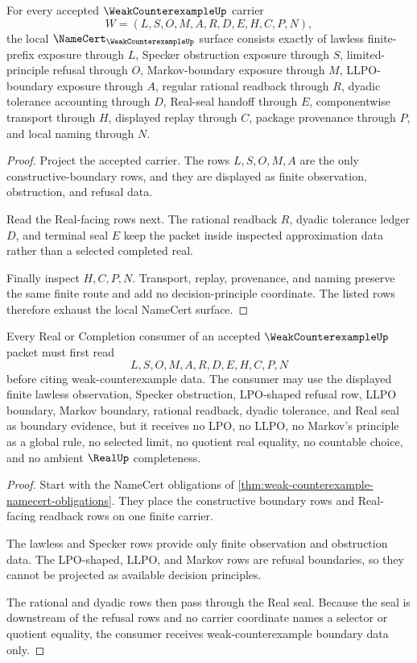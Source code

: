 \begin{theorem}
\label{thm:weak-counterexample-namecert-obligations}
For every accepted $\WeakCounterexampleUp$ carrier
$$
W=(L,S,O,M,A,R,D,E,H,C,P,N),
$$
the local $\NameCert_{\WeakCounterexampleUp}$ surface consists exactly of lawless finite-prefix exposure through $L$, Specker obstruction exposure through $S$, limited-principle refusal through $O$, Markov-boundary exposure through $M$, LLPO-boundary exposure through $A$, regular rational readback through $R$, dyadic tolerance accounting through $D$, Real-seal handoff through $E$, componentwise transport through $H$, displayed replay through $C$, package provenance through $P$, and local naming through $N$.
\end{theorem}
\begin{proof}
Project the accepted carrier. The rows $L,S,O,M,A$ are the only constructive-boundary rows, and they are displayed as finite observation, obstruction, and refusal data.

Read the Real-facing rows next. The rational readback $R$, dyadic tolerance ledger $D$, and terminal seal $E$ keep the packet inside inspected approximation data rather than a selected completed real.

Finally inspect $H,C,P,N$. Transport, replay, provenance, and naming preserve the same finite route and add no decision-principle coordinate. The listed rows therefore exhaust the local NameCert surface.
\end{proof}

\begin{theorem}
\label{thm:weak-counterexample-choice-principle-boundary}
Every Real or Completion consumer of an accepted $\WeakCounterexampleUp$ packet must first read
$$
L,S,O,M,A,R,D,E,H,C,P,N
$$
before citing weak-counterexample data. The consumer may use the displayed finite lawless observation, Specker obstruction, LPO-shaped refusal row, LLPO boundary, Markov boundary, rational readback, dyadic tolerance, and Real seal as boundary evidence, but it receives no LPO, no LLPO, no Markov's principle as a global rule, no selected limit, no quotient real equality, no countable choice, and no ambient $\RealUp$ completeness.
\end{theorem}
\begin{proof}
Start with the NameCert obligations of \autoref{thm:weak-counterexample-namecert-obligations}. They place the constructive boundary rows and Real-facing readback rows on one finite carrier.

The lawless and Specker rows provide only finite observation and obstruction data. The LPO-shaped, LLPO, and Markov rows are refusal boundaries, so they cannot be projected as available decision principles.

The rational and dyadic rows then pass through the Real seal. Because the seal is downstream of the refusal rows and no carrier coordinate names a selector or quotient equality, the consumer receives weak-counterexample boundary data only.
\end{proof}

